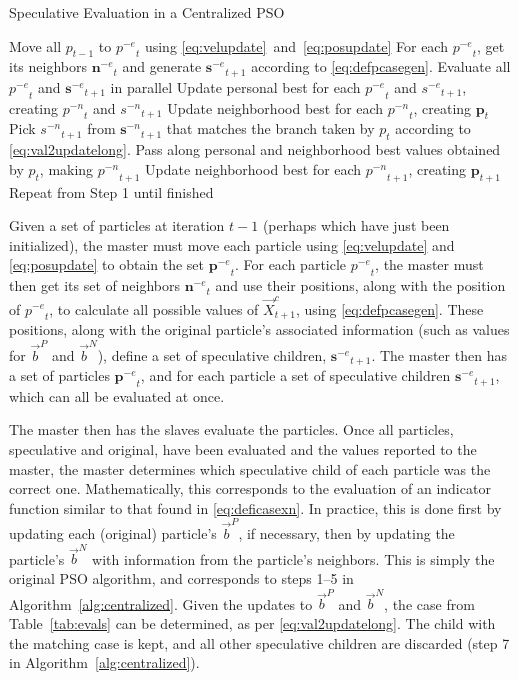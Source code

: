 \documentclass[smallcondensed]{svjour3}
\newcommand{\alg}[1]{Algorithm~\ref{alg:#1}}
\providecommand{\pers}{\ensuremath{P}}
\providecommand{\neigh}{\ensuremath{N}}
\providecommand{\nbest}{\ensuremath{\Vec{b}^\neigh}}
\providecommand{\pbest}{\ensuremath{\Vec{b}^\pers}}
\providecommand{\specpos}{\ensuremath{\vec{X}}}
\providecommand{\casegen}{\ensuremath{c}}
\providecommand{\noeval}[1]{\ensuremath{#1^{-e}}}
\providecommand{\nonbest}[1]{\ensuremath{#1^{-n}}}
\providecommand{\p}{\ensuremath{p}}
\providecommand{\pset}{\ensuremath{\mathbf{p}}}
\providecommand{\s}{\ensuremath{s}}
\providecommand{\sset}{\ensuremath{\mathbf{s}}}
\providecommand{\nset}{\ensuremath{\mathbf{n}}}
\begin{document}
\begin{algorithm}
  \caption{Speculative Evaluation in a Centralized PSO}
  \label{alg:centralized}
  \begin{algorithmic}[1]
	\STATE Move all $\p_{t-1}$ to $\noeval{\p}_t$ using
	  \eqref{eq:velupdate}~and~\eqref{eq:posupdate}
	\STATE For each $\noeval{\p}_t$, get its neighbors $\noeval{\nset}_t$ and
	  generate $\noeval{\sset}_{t+1}$ according to
	  \eqref{eq:defpcasegen}.
	\STATE Evaluate all $\noeval{\p}_t$ and $\noeval{\sset}_{t+1}$ in parallel
	\STATE Update personal best for each $\noeval{\p}_t$ and
	  $\noeval{\s}_{t+1}$, creating $\nonbest{\p}_t$ and $\nonbest{\s}_{t+1}$
	\STATE Update neighborhood best for each $\nonbest{\p}_t$, creating
	  $\pset_t$
	\FORALL{$\p_t$}
	\STATE Pick $\nonbest{\s}_{t+1}$ from $\nonbest{\sset}_{t+1}$ that matches
	  the branch taken by $\p_t$ according to
	  \eqref{eq:val2updatelong}.
	\STATE Pass along personal and neighborhood best values obtained by $\p_t$,
	  making $\nonbest{\p}_{t+1}$
	\ENDFOR
	\STATE Update neighborhood best for each $\nonbest{\p}_{t+1}$, creating
	  $\pset_{t+1}$
	\STATE Repeat from Step 1 until finished
  \end{algorithmic}
\end{algorithm}

Given a set of particles at iteration $t-1$ (perhaps which have just been
initialized), the master must move each particle using \eqref{eq:velupdate} and
\eqref{eq:posupdate} to obtain the set $\noeval{\pset}_t$.  For each particle
$\noeval{\p}_t$, the master must then get its set of neighbors
$\noeval{\nset}_t$ and use their positions, along with the position of
$\noeval{\p}_t$, to calculate all possible values of
$\specpos_{t+1}^{\casegen}$, using \eqref{eq:defpcasegen}.  These positions,
along with the original particle's associated information (such as values for
$\pbest$ and $\nbest$), define a set of speculative children,
$\noeval{\sset}_{t+1}$.  The master then has a set of particles
$\noeval{\pset}_t$, and for each particle a set of speculative children
$\noeval{\sset}_{t+1}$, which can all be evaluated at once.

The master then has the slaves evaluate the particles.  Once all particles,
speculative and original, have been evaluated and the values reported to the
master, the master determines which speculative child of each particle was the
correct one.  Mathematically, this corresponds to the evaluation of an
indicator function similar to that found in \eqref{eq:deficasexn}.  In
practice, this is done first by updating each (original) particle's $\pbest$,
if necessary, then by updating the particle's $\nbest$ with information from
the particle's neighbors.  This is simply the original PSO algorithm, and
corresponds to steps 1--5 in \alg{centralized}.  Given the updates to $\pbest$
and $\nbest$, the case from Table~\ref{tab:evals} can be determined, as per
\eqref{eq:val2updatelong}.  The child with the matching case is kept, and all
other speculative children are discarded (step 7 in \alg{centralized}).
\end{document}
